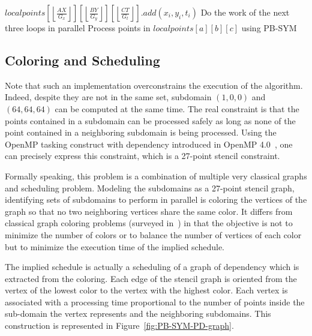 \documentclass[10pt, conference, compsocconf]{IEEEtran}
\newcommand{\floor}[1]{\left\lfloor #1 \right\rfloor}
\begin{document}
\begin{algorithm}
\caption{\textsc{PB-SYM-PD}}
\scriptsize
\begin{algorithmic}
  \State $localpoints[\floor{\frac{A X}{G_x}}][\floor{\frac{B Y}{G_y}}][\floor{\frac{C T}{G_t}}].add(x_i,y_i,t_i)$
\EndFor
%
      \State Do the work of the next three loops in parallel
            \State Process points in $localpoints[a][b][c]$ using PB-SYM
          \EndFor
        \EndFor
      \EndFor
    \EndFor
  \EndFor
\EndFor
\end{algorithmic}
\label{alg:pb-sym-pd}
\end{algorithm}


\subsection{Coloring and Scheduling}

Note that such an implementation overconstrains the execution of the
algorithm. Indeed, despite they are not in the same set, subdomain $(1,
0, 0)$ and $(64, 64, 64)$ can be computed at the same time. The real
constraint is that the points contained in a subdomain can be
processed safely as long as none of the point contained in a
neighboring subdomain is being processed. Using the OpenMP tasking
construct with dependency introduced in OpenMP 4.0~\cite{OpenMP4}, one
can precisely express this constraint, which is a 27-point stencil
constraint.

Formally speaking, this problem is a combination of multiple very
classical graphs and scheduling problem. Modeling the subdomains as a
27-point stencil graph, identifying sets of subdomains to perform in
parallel is coloring the vertices of the graph so that no two
neighboring vertices share the same color. It differs from classical
graph coloring problems (surveyed in~\cite{GMP05}) in that the objective
is not to minimize the number of colors or to balance the number of
vertices of each color but to minimize the execution time of the
implied schedule.

The implied schedule is actually a scheduling of a graph of dependency
which is extracted from the coloring. Each edge of the stencil graph
is oriented from the vertex of the lowest color to the vertex with the
highest color. Each vertex is associated with a processing time 
proportional to the number of points inside the sub-domain
the vertex represents and the neighboring subdomains. This
construction is represented in Figure~\ref{fig:PB-SYM-PD-graph}.
\end{document}
